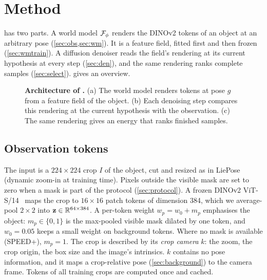 \section{Method}
\label{sec:method}

\method has two parts. A world model $\mathcal{F}_\phi$ renders the DINOv2 tokens of an object at an arbitrary pose (\cref{sec:obs,sec:wm}). It is
a feature field, fitted first and then frozen (\cref{sec:wmtrain}). A diffusion denoiser reads the field's rendering at its current
hypothesis at every step (\cref{sec:den}), and the same rendering ranks complete samples (\cref{sec:select}).  gives
an overview.

\begin{figure}[t]
\centering
{}
\caption{\textbf{Architecture of \method.} (a) The world model renders tokens at pose $g$ from a feature field of the object.
(b) Each denoising step compares this rendering at the current hypothesis with the observation. (c) The same rendering gives an energy
that ranks finished samples.}
\label{fig:method}
\end{figure}

\subsection{Observation tokens}
\label{sec:obs}
The input is a $224\times224$ crop $I$ of the object, cut and resized as in LiePose (dynamic zoom-in at training time). Pixels outside
the visible mask are set to zero when a mask is part of the protocol (\cref{sec:protocol}). A frozen DINOv2
ViT-S/14~\cite{oquab2024dinov2} maps the crop to $16\times16$ patch tokens of dimension 384, which we average-pool $2\times2$ into
$\mathbf{z}\in\mathbb{R}^{64\times384}$. A per-token weight $w_p=w_0+m_p$ emphasises the object: $m_p\in\{0,1\}$ is the max-pooled visible mask
dilated by one token, and $w_0=0.05$ keeps a small weight on background tokens. Where no mask is available (SPEED+), $m_p=1$. The crop
is described by its \emph{crop camera} $k$: the zoom, the crop origin, the box size and the image's intrinsics. $k$ contains no pose
information, and it maps a crop-relative pose (\cref{sec:background}) to the camera frame. Tokens of all training crops are computed
once and cached.

